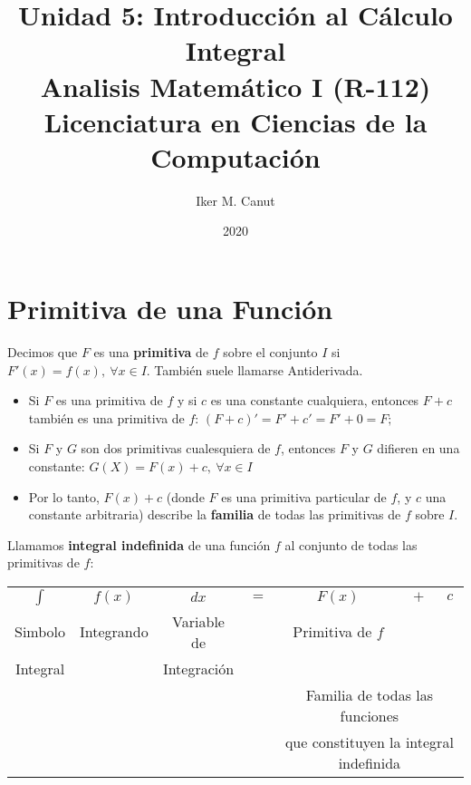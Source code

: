 \documentclass[11pt,a4paper]{article}
\author{Iker M. Canut}
\title{Unidad 5: Introducci\'on al C\'alculo Integral\\ Analisis Matem\'atico I (R-112)\\Licenciatura en Ciencias de la Computaci\'on}
\date{2020}
\begin{document}
\maketitle
\newpage

\section{Primitiva de una Funci\'on}
Decimos que $F$ es una \textbf{primitiva} de $f$ sobre el conjunto $I$ si $F'(x) = f(x),\ \forall x \in I$. Tambi\'en suele llamarse Antiderivada.

\begin{itemize}
\item Si $F$ es una primitiva de $f$ y si $c$ es una constante cualquiera, entonces $F+c$ tambi\'en es una primitiva de $f$: $(F+c)' = F'+c' = F'+0 = F;$
\item Si $F$ y $G$ son dos primitivas cualesquiera de $f$, entonces $F$ y $G$ difieren en una constante: $G(X)=F(x)+c,\ \forall x \in I$
\item Por lo tanto, $F(x)+c$ (donde $F$ es una primitiva particular de $f$, y $c$ una constante arbitraria) describe la \textbf{familia} de todas las primitivas de $f$ sobre $I$.
\end{itemize}

Llamamos \textbf{integral indefinida} de una funci\'on $f$ al conjunto de todas las primitivas de $f$: 

\begin{table}[h]
\centering
\begin{tabular}{ccccccc}
$\int$ & $f(x)$ & $dx$ & $=$ & $F(x)$ & $+$ & $c$\\
Simbolo & Integrando & Variable de  && Primitiva de $f$ & & \\
Integral & & Integraci\'on & & \multicolumn{3}{|c|}{}\\
\cline{5-7}
& & & & \multicolumn{3}{c}{Familia de todas las funciones}\\
& & & & \multicolumn{3}{c}{que constituyen la integral indefinida}\\
\end{tabular}
\end{table}
\end{document}
